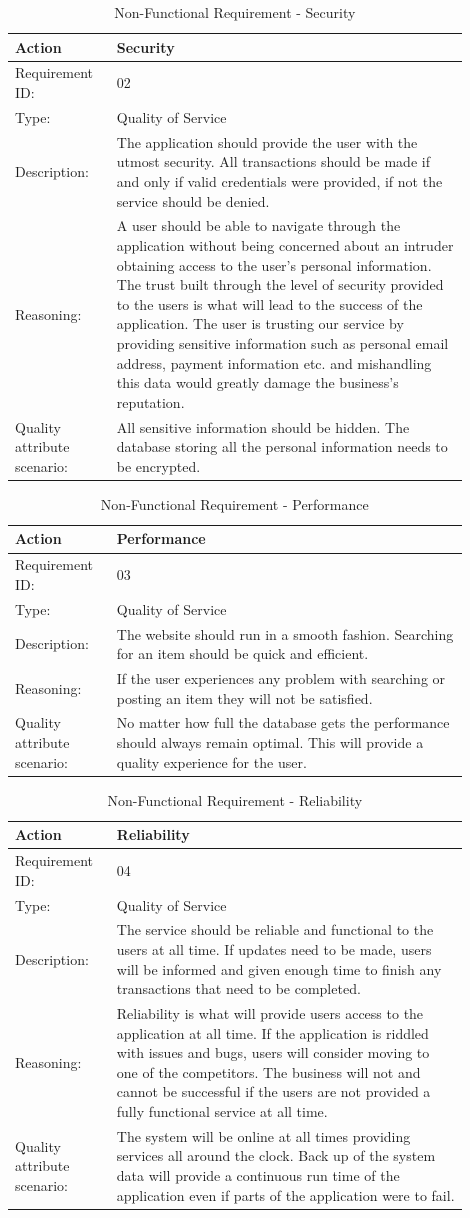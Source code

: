 \documentclass[11pt]{article}
\newcounter{use case ID}
\newcommand\addrow[2]{#1 & #2\\ \hline}
\newcounter{req ID}
\newcommand\tabularheadfsd[1]{
            \begin{table}[ht]
                \addtocounter{req ID}{1}
                \caption{Non-Functional Requirement \arabic{req ID} - #1}
                \vspace{0.2cm}
                \begin{tabular}{|p{0.2\linewidth}|p{0.70\linewidth}|}
                    \hline
                    \textbf{Action} & \textbf{#1} \\
                    \hline}
\newenvironment{requirement}{\tabularheadfsd}
                {\hline\end{tabular}\end{table}}
\begin{document}
\begin{requirement}{Security}
    \addrow{Requirement ID:}{02}
    \addrow{Type:}{Quality of Service}
    \addrow{Description:}{The application should provide the user with the utmost security. All transactions should be made if and only if valid credentials were provided, if not the service should be denied.}
    \addrow{Reasoning:}{A user should be able to navigate through the application without being concerned about an intruder obtaining access to the user's personal information. The trust built through the level of security provided to the users is what will lead to the success of the application. The user is trusting our service by providing sensitive information such as personal email address, payment information etc. and mishandling this data would greatly damage the business's reputation.  }
    \addrow{Quality attribute scenario:}{All sensitive information should be hidden. The database storing all the personal information needs to be encrypted.}
\end{requirement}

\begin{requirement}{Performance}
    \addrow{Requirement ID:}{03}
    \addrow{Type:}{Quality of Service}
    \addrow{Description:}{The website should run in a smooth fashion. Searching for an item should be quick and efficient.}
    \addrow{Reasoning:}{If the user experiences any problem with searching or posting an item they will not be satisfied.}
    \addrow{Quality attribute scenario:}{No matter how full the database gets the performance should always remain optimal. This will provide a quality experience for the user.}
\end{requirement}

\begin{requirement}{Reliability}
    \addrow{Requirement ID:}{04}
    \addrow{Type:}{Quality of Service}
    \addrow{Description:}{The service should be reliable and functional to the users at all time. If updates need to be made, users will be informed and given enough time to finish any transactions that need to be completed. }
    \addrow{Reasoning:}{Reliability is what will provide users access to the application at all time. If the application is riddled with issues and bugs, users will consider moving to one of the competitors. The business will not and cannot be successful if the users are not provided a fully functional service at all time. }
    \addrow{Quality attribute scenario:}{The system will be online at all times providing services all around the clock. Back up of the system data will provide a continuous run time of the application even if parts of the application were to fail.}
\end{requirement}
\end{document}
